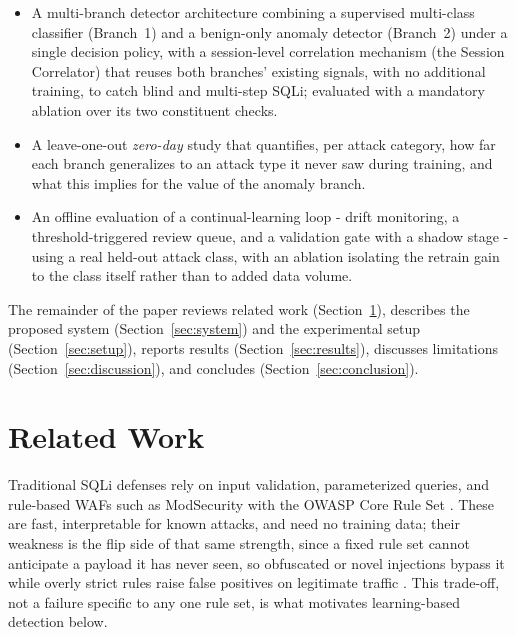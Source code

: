 \documentclass[conference]{IEEEtran}
\begin{document}
\begin{itemize}
\item A multi-branch detector architecture combining a supervised multi-class classifier (Branch~1) and a benign-only anomaly detector (Branch~2) under a single decision policy, with a session-level correlation mechanism (the Session Correlator) that reuses both branches' existing signals, with no additional training, to catch blind and multi-step SQLi; evaluated with a mandatory ablation over its two constituent checks.
\item A leave-one-out \emph{zero-day} study that quantifies, per attack category, how far each branch generalizes to an attack type it never saw during training, and what this implies for the value of the anomaly branch.
\item An offline evaluation of a continual-learning loop - drift monitoring, a threshold-triggered review queue, and a validation gate with a shadow stage - using a real held-out attack class, with an ablation isolating the retrain gain to the class itself rather than to added data volume.
\end{itemize}

The remainder of the paper reviews related work (Section~\ref{sec:related}), describes the proposed system (Section~\ref{sec:system}) and the experimental setup (Section~\ref{sec:setup}), reports results (Section~\ref{sec:results}), discusses limitations (Section~\ref{sec:discussion}), and concludes (Section~\ref{sec:conclusion}).

\section{Related Work}\label{sec:related}
Traditional SQLi defenses rely on input validation, parameterized queries, and rule-based WAFs such as ModSecurity with the OWASP Core Rule Set \cite{b13}. These are fast, interpretable for known attacks, and need no training data; their weakness is the flip side of that same strength, since a fixed rule set cannot anticipate a payload it has never seen, so obfuscated or novel injections bypass it while overly strict rules raise false positives on legitimate traffic \cite{b1,b13}. This trade-off, not a failure specific to any one rule set, is what motivates learning-based detection below.
\end{document}
